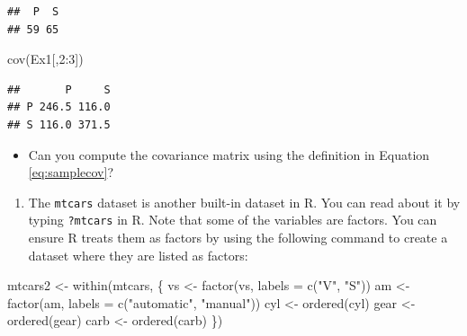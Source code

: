 \documentclass[
]{book}
\newenvironment{Shaded}{\begin{snugshade}}{\end{snugshade}}
\newcommand{\AttributeTok}[1]{\textcolor[rgb]{0.77,0.63,0.00}{#1}}
\newcommand{\DecValTok}[1]{\textcolor[rgb]{0.00,0.00,0.81}{#1}}
\newcommand{\FunctionTok}[1]{\textcolor[rgb]{0.00,0.00,0.00}{#1}}
\newcommand{\NormalTok}[1]{#1}
\newcommand{\OtherTok}[1]{\textcolor[rgb]{0.56,0.35,0.01}{#1}}
\newcommand{\SpecialCharTok}[1]{\textcolor[rgb]{0.00,0.00,0.00}{#1}}
\newcommand{\StringTok}[1]{\textcolor[rgb]{0.31,0.60,0.02}{#1}}
\providecommand{\tightlist}{%
  \setlength{\itemsep}{0pt}\setlength{\parskip}{0pt}}
\theoremstyle{definition}
\theoremstyle{definition}
\theoremstyle{definition}
\theoremstyle{definition}
\theoremstyle{remark}
\begin{document}
\begin{verbatim}
##  P  S 
## 59 65
\end{verbatim}

\begin{Shaded}
\begin{Highlighting}[]
\FunctionTok{cov}\NormalTok{(Ex1[,}\DecValTok{2}\SpecialCharTok{:}\DecValTok{3}\NormalTok{])}
\end{Highlighting}
\end{Shaded}

\begin{verbatim}
##       P     S
## P 246.5 116.0
## S 116.0 371.5
\end{verbatim}

\begin{itemize}
\tightlist
\item
  Can you compute the covariance matrix using the definition in Equation \eqref{eq:samplecov}?
\end{itemize}

\begin{enumerate}
\def\labelenumi{\arabic{enumi}.}
\setcounter{enumi}{2}
\tightlist
\item
  The \texttt{mtcars} dataset is another built-in dataset in R. You can read about it by typing \texttt{?mtcars} in R. Note that some of the variables are factors. You can ensure R treats them as factors by using the following command to create a dataset where they are listed as factors:
\end{enumerate}

\begin{Shaded}
\begin{Highlighting}[]
\NormalTok{mtcars2 }\OtherTok{\textless{}{-}} \FunctionTok{within}\NormalTok{(mtcars, \{}
\NormalTok{   vs }\OtherTok{\textless{}{-}} \FunctionTok{factor}\NormalTok{(vs, }\AttributeTok{labels =} \FunctionTok{c}\NormalTok{(}\StringTok{"V"}\NormalTok{, }\StringTok{"S"}\NormalTok{))}
\NormalTok{   am }\OtherTok{\textless{}{-}} \FunctionTok{factor}\NormalTok{(am, }\AttributeTok{labels =} \FunctionTok{c}\NormalTok{(}\StringTok{"automatic"}\NormalTok{, }\StringTok{"manual"}\NormalTok{))}
\NormalTok{   cyl  }\OtherTok{\textless{}{-}} \FunctionTok{ordered}\NormalTok{(cyl)}
\NormalTok{   gear }\OtherTok{\textless{}{-}} \FunctionTok{ordered}\NormalTok{(gear)}
\NormalTok{   carb }\OtherTok{\textless{}{-}} \FunctionTok{ordered}\NormalTok{(carb)}
\NormalTok{\})}
\end{Highlighting}
\end{Shaded}
\end{document}
